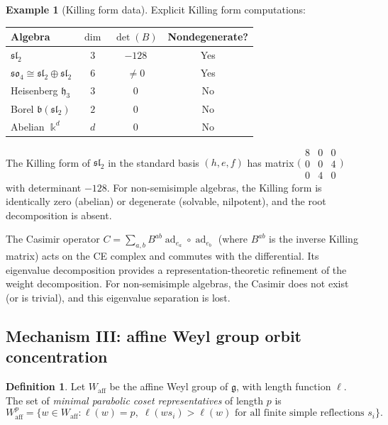 \documentclass[11pt,reqno]{amsart}
\theoremstyle{plain}
\theoremstyle{definition}
\newtheorem{definition}[theorem]{Definition}
\newtheorem{example}[theorem]{Example}
\theoremstyle{remark}
\DeclareMathOperator{\ad}{ad}
\newcommand{\fg}{\mathfrak{g}}
\newcommand{\fh}{\mathfrak{h}}
\newcommand{\fb}{\mathfrak{b}}
\newcommand{\Waff}{W_{\mathrm{aff}}}
\newcommand{\kk}{\Bbbk}
\begin{document}
\begin{example}[Killing form data]\label{ex:killing-data}
 Explicit Killing form computations:
 \begin{center}
 \begin{tabular}{lccc}
 \toprule
 Algebra & $\dim$ & $\det(B)$ & Nondegenerate? \\
 \midrule
 $\mathfrak{sl}_2$ & $3$ & $-128$ & Yes \\
 $\mathfrak{so}_4 \cong \mathfrak{sl}_2 \oplus \mathfrak{sl}_2$ & $6$ &
 $\neq 0$ & Yes \\
 Heisenberg $\fh_3$ & $3$ & $0$ & No \\
 Borel $\fb(\mathfrak{sl}_2)$ & $2$ & $0$ & No \\
 Abelian $\kk^d$ & $d$ & $0$ & No \\
 \bottomrule
 \end{tabular}
 \end{center}
 The Killing form of $\mathfrak{sl}_2$ in the standard basis $(h, e, f)$
 has matrix $\bigl(\begin{smallmatrix} 8 & 0 & 0 \\ 0 & 0 & 4 \\
 0 & 4 & 0 \end{smallmatrix}\bigr)$ with determinant $-128$. For
 non-semisimple algebras, the Killing form is identically zero (abelian) or
 degenerate (solvable, nilpotent), and the root decomposition is absent.
\end{example}

The Casimir operator $C = \sum_{a,b} B^{ab} \ad_{e_a} \circ \ad_{e_b}$
(where $B^{ab}$ is the inverse Killing matrix) acts on the CE complex and
commutes with the differential. Its eigenvalue decomposition provides a
representation-theoretic refinement of the weight decomposition. For
non-semisimple algebras, the Casimir does not exist (or is trivial), and
this eigenvalue separation is lost.


\subsection{Mechanism III: affine Weyl group orbit concentration}
\label{sec:weyl}

\begin{definition}\label{def:minimal-reps}
 Let $\Waff$ be the affine Weyl group of $\fg$, with length function
 $\ell$. The set of \emph{minimal parabolic coset representatives} of
 length $p$ is
 \[
 \Waff^p = \{ w \in \Waff : \ell(w) = p, \; \ell(w s_i) > \ell(w)
 \text{ for all finite simple reflections } s_i \}.
 \]
\end{definition}
\end{document}
